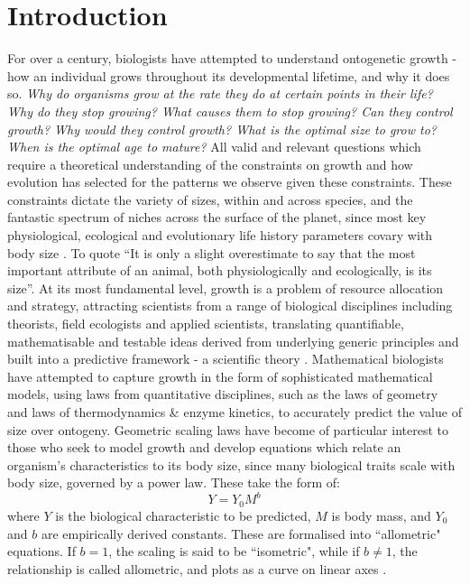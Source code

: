 \documentclass[a4paper]{article} %
\begin{document}
\section{Introduction}\thispagestyle{empty}
    For over a century, biologists have attempted to understand ontogenetic growth - how an individual grows throughout its developmental lifetime, and why it does so. \textit{Why do organisms grow at the rate they do at certain points in their life? Why do they stop growing? What causes them to stop growing? Can they control growth? Why would they control growth? What is the optimal size to grow to? When is the optimal age to mature?} All valid and relevant questions which require a theoretical understanding of the constraints on growth and how evolution has selected for the patterns we observe given these constraints. These constraints dictate the variety of sizes, within and across species, and the fantastic spectrum of niches across the surface of the planet, since most key physiological, ecological and evolutionary life history parameters covary with body size \autocite{peters1983, brown2000-scaling-book,schmidt1984scaling,Marshall2019b}. To quote \cite{Bartholomew1981} ``It is only a slight overestimate to say that the most important attribute of an animal, both physiologically and ecologically, is its size''. At its most fundamental level, growth is a problem of resource allocation and strategy, attracting scientists from a range of biological disciplines including theorists, field ecologists and applied scientists, translating quantifiable, mathematisable and testable ideas derived from underlying generic principles and built into a predictive framework - a scientific theory \autocite{popper1962,popper1972,peters1983, West2011}. Mathematical biologists have attempted to capture growth in the form of sophisticated mathematical models, using laws from quantitative disciplines, such as the laws of geometry and laws of thermodynamics \& enzyme kinetics, to accurately predict the value of size over ontogeny. Geometric scaling laws have become of particular interest to those who seek to model growth and develop equations which relate an organism's characteristics to its body size, since many biological traits scale with body size, governed by a power law. These take the form of:
        \begin{equation*}
            Y = Y_0 M^b
        \end{equation*}
    where $Y$ is the biological characteristic to be predicted, $M$ is body mass, and $Y_0$ and $b$ are empirically derived constants. These are formalised into ``allometric" equations. If $b = 1$, the scaling is said to be ``isometric", while if $b \neq 1$, the relationship is called allometric, and plots as a curve on linear axes \autocite{brown2000-scaling-book}.
\end{document}
